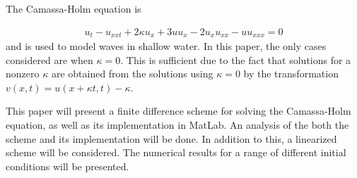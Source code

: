 The Camassa-Holm equation is

\begin{align}
u_{t} - u_{xxt} + 2\kappa u_{x} + 3uu_{x} - 2u_{x}u_{xx} - uu_{xxx} = 0
\end{align}
and is used to model waves in shallow water. 
In this paper, the only cases considered are when $\kappa = 0$. This is sufficient due to the fact that solutions for a nonzero $\kappa$ are obtained from the solutions using $\kappa = 0$ by the transformation $v(x,t) = u(x + \kappa t, t) - \kappa$.

This paper will present a finite difference scheme for solving the Camassa-Holm equation, as well as its implementation in MatLab. An analysis of the both the scheme and its implementation will be done. In addition to this, a linearized scheme will be considered. The numerical results for a range of different initial conditions will be presented. 